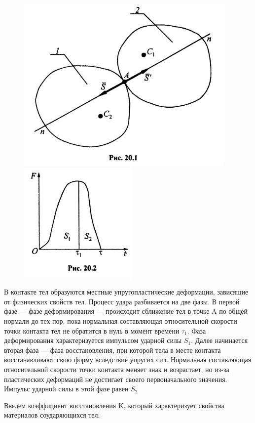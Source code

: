 {\begin{center}
\begin{figure}[H]
    \centering\includegraphics[scale=0.5]{img/20.1.jpeg} 
    \qquad \qquad
    \centering\includegraphics[scale=0.6]{img/20.2.jpeg}
\end{figure}

\par В контакте тел образуются местные упругопластические деформации, зависящие от физических свойств тел. Процесс удара разбивается на две фазы. В первой фазе — фазе деформирования — происходит сближение тел в точке A по общей нормали до тех пор, пока нормальная составляющая относительной скорости точки контакта тел не обратится в нуль в момент времени $\tau_1$. Фаза деформирования характеризуется импульсом ударной силы $S_1$. Далее начинается вторая фаза — фаза восстановления, при которой тела в месте контакта восстанавливают свою форму вследствие упругих сил. Нормальная составляющая относительной скорости точки контакта меняет знак и возрастает, но из-за пластических деформаций не достигает своего первоначального значения. Импульс ударной силы в этой фазе равен $S_2$

\par Введем коэффициент восстановления K, который характеризует свойства материалов соударяющихся тел:


\end{center}}
